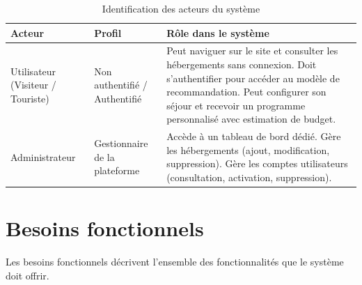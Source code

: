 \documentclass[12pt,a4paper]{report}
\begin{document}
\begin{table}[H]
\centering
\renewcommand{\arraystretch}{1.4}
\begin{tabularx}{\textwidth}{|l|l|X|}
\hline
\textbf{Acteur} & \textbf{Profil} & \textbf{Rôle dans le système} \\
\hline
Utilisateur (Visiteur / Touriste) & Non authentifié / Authentifié &
  Peut naviguer sur le site et consulter les hébergements sans connexion.
  Doit s'authentifier pour accéder au modèle de recommandation.
  Peut configurer son séjour et recevoir un programme personnalisé avec
  estimation de budget. \\
\hline
Administrateur & Gestionnaire de la plateforme &
  Accède à un tableau de bord dédié. Gère les hébergements (ajout,
  modification, suppression). Gère les comptes utilisateurs (consultation,
  activation, suppression). \\
\hline
\end{tabularx}
\caption{Identification des acteurs du système}
\end{table}

\chapter{Besoins fonctionnels}

Les besoins fonctionnels décrivent l'ensemble des fonctionnalités que le
système doit offrir.
\end{document}
